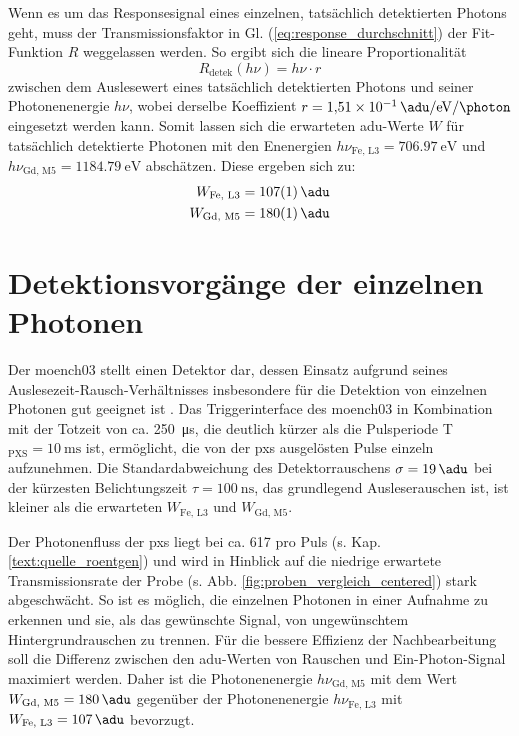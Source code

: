 \noindent
Wenn es um das Responsesignal eines einzelnen, tatsächlich detektierten Photons geht, muss der Transmissionsfaktor in Gl. (\ref{eq:response_durchschnitt}) der Fit-Funktion $R$ weggelassen werden. So ergibt sich die lineare Proportionalität
\begin{equation}
    R_\text{detek}(h\nu) = h\nu \cdot r
    \label{eq:adu_to_ev}
\end{equation}
zwischen dem Auslesewert eines tatsächlich detektierten Photons und seiner Photonenenergie $h\nu$, wobei derselbe Koeffizient $r = \SI[per-mode = symbol]{1.51e-1}{\adu\per\eV\per\photon}$ eingesetzt werden kann. Somit lassen sich die erwarteten \gls{adu}-Werte $W$ für tatsächlich detektierte Photonen mit den Enenergien $h\nu_{\text{Fe, L3}} = \SI{706.97}{\eV}$ und $h\nu_{\text{Gd, M5}} = \SI{1184.79}{\eV}$ abschätzen. Diese ergeben sich zu:
\begin{equation}
\begin{split}
     W_{\text{Fe, L3}} &=  \SI{107(1)}{\adu}\\
     W_{\text{Gd, M5}} &=  \SI{180(1)}{\adu}
\end{split}
\label{eq:auselesewerte_fe_gd}
\end{equation}


\section{Detektionsvorgänge der einzelnen Photonen}
\label{text:single_photon_theorie}
Der \gls{moench03} stellt einen Detektor dar, dessen Einsatz aufgrund seines Auslesezeit-Rausch-Ver\-hält\-nis\-ses insbesondere für die Detektion von einzelnen Photonen gut geeignet ist \cite{bergamaschi_monch_2018}. Das Triggerinterface des \gls{moench03} in Kombination mit der Totzeit von ca. \SI{250}{\micro\second}, die deutlich kürzer als die Pulsperiode T$_\text{PXS} = \SI{10}{\milli\second}$ ist, ermöglicht, die von der \gls{pxs} ausgelösten Pulse einzeln aufzunehmen. Die Standardabweichung des Detektorrauschens $\sigma = \SI{19}{\adu}$ bei der kürzesten Belichtungszeit $\tau = \SI{100}{\nano\second}$, das grundlegend Ausleserauschen ist, ist kleiner als die erwarteten $W_{\text{Fe, L3}}$ und $W_{\text{Gd, M5}}$.

\noindent
Der Photonenfluss der \gls{pxs} liegt bei ca. \SI{617}{\photons} pro Puls (s. Kap. \ref{text:quelle_roentgen}) und wird in Hinblick auf die niedrige erwartete Transmissionsrate der Probe (s. Abb. \ref{fig:proben_vergleich_centered}) stark abgeschwächt. So ist es möglich, die einzelnen Photonen in einer Aufnahme zu erkennen und sie, als das gewünschte Signal, von ungewünschtem Hintergrundrauschen zu trennen. Für die bessere Effizienz der Nachbearbeitung soll die Differenz zwischen den \gls{adu}-Werten von Rauschen und Ein-Photon-Signal maximiert werden. Daher ist die Photonenenergie $h\nu_\text{Gd, M5}$ mit dem Wert $W_{\text{Gd, M5}} = \SI{180}{\adu}$ gegenüber der Photonenenergie $h\nu_\text{Fe, L3}$ mit $W_{\text{Fe, L3}} = \SI{107}{\adu}$ bevorzugt.

